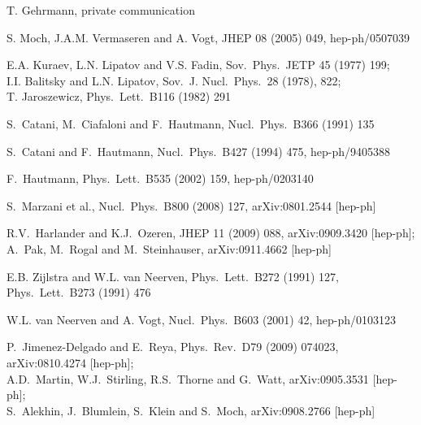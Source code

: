 \documentclass[12pt]{article}
\begin{document}
{\begin{thebibliography}{10}
T. Gehrmann, private communication

S. Moch, J.A.M. Vermaseren and A. Vogt,
  JHEP 08 (2005) 049, hep-ph/0507039

E.A. Kuraev, L.N. Lipatov and V.S. Fadin,
  Sov.\ Phys.\ JETP 45 (1977) 199; \\
I.I. Balitsky and L.N. Lipatov, 
  Sov.\ J. Nucl.\ Phys.\ 28 (1978), 822; \\
T. Jaroszewicz,
   Phys.\ Lett.\ B116 (1982) 291

S.~Catani, M.~Ciafaloni and F.~Hautmann,
  Nucl.\ Phys.\  B366 (1991) 135

S.~Catani and F.~Hautmann,
  Nucl.\ Phys.\  B427 (1994) 475, hep-ph/9405388

F.~Hautmann,
  Phys.\ Lett.\  B535 (2002) 159, hep-ph/0203140

S.~Marzani et al.,
  Nucl.\ Phys.\  B800 (2008) 127, arXiv:0801.2544 [hep-ph]

R.V.~Harlander and K.J.~Ozeren,
  JHEP 11 (2009) 088, arXiv:0909.3420 [hep-ph]; \\
A.~Pak, M.~Rogal and M.~Steinhauser,
  arXiv:0911.4662 [hep-ph]

E.B. Zijlstra and W.L. van Neerven,
  Phys.\ Lett.\ B272 (1991) 127,
  Phys.\ Lett.\ B273 (1991) 476

W.L. van Neerven and A. Vogt,
  Nucl.\ Phys.\ B603 (2001) 42, hep-ph/0103123

P.~Jimenez-Delgado and E.~Reya,
  Phys.\ Rev.\  D79 (2009) 074023, arXiv:0810.4274 [hep-ph]; \\
A.D.~Martin, W.J.~Stirling, R.S.~Thorne and G.~Watt,
  arXiv:0905.3531 [hep-ph]; \\
S.~Alekhin, J.~Blumlein, S.~Klein and S.~Moch,
  arXiv:0908.2766 [hep-ph]


\end{thebibliography}}
\end{document}
